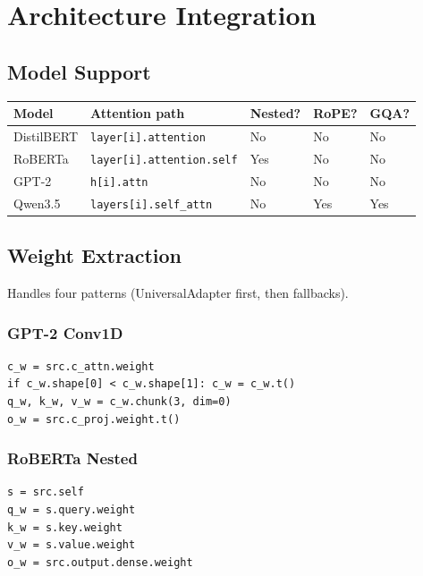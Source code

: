 \section{Architecture Integration}

\subsection{Model Support}

\begin{table}[H]
\centering
\small
\begin{tabular}{lllll}
\toprule
\textbf{Model} & \textbf{Attention path} & \textbf{Nested?} & \textbf{RoPE?} & \textbf{GQA?} \\
\midrule
DistilBERT & \texttt{layer[i].attention} & No & No & No \\
RoBERTa & \texttt{layer[i].attention.self} & Yes & No & No \\
GPT-2 & \texttt{h[i].attn} & No & No & No \\
Qwen3.5 & \texttt{layers[i].self\_attn} & No & Yes & Yes \\
\bottomrule
\end{tabular}
\end{table}

\subsection{Weight Extraction}

Handles four patterns (UniversalAdapter first, then fallbacks).

\subsubsection{GPT-2 Conv1D}

\begin{lstlisting}
c_w = src.c_attn.weight
if c_w.shape[0] < c_w.shape[1]: c_w = c_w.t()
q_w, k_w, v_w = c_w.chunk(3, dim=0)
o_w = src.c_proj.weight.t()
\end{lstlisting}

\subsubsection{RoBERTa Nested}

\begin{lstlisting}
s = src.self
q_w = s.query.weight
k_w = s.key.weight
v_w = s.value.weight
o_w = src.output.dense.weight
\end{lstlisting}

